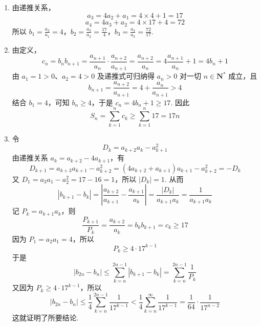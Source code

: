 \begin{solution}
\begin{enumerate}
\item 由递推关系，
\[
a_3=4a_2+a_1=4\times4+1=17
\]
\[
a_4=4a_3+a_2=4\times17+4=72
\]
所以
\(b_1=\frac{a_2}{a_1}=4\)，\(b_2=\frac{a_3}{a_2}=\frac{17}{4}\)，\(b_3=\frac{a_4}{a_3}=\frac{72}{17}\).

\item 由定义，
\[
c_n=b_nb_{n+1}=\frac{a_{n+1}}{a_n}\cdot\frac{a_{n+2}}{a_{n+1}}=\frac{a_{n+2}}{a_n}=4\frac{a_{n+1}}{a_n}+1=4b_n+1
\]
由 \(a_1=1>0\)、\(a_2=4>0\) 及递推式可归纳得 \(a_n>0\) 对一切 \(n\in\mathbf N^*\) 成立，且
\[
b_{n+1}=\frac{a_{n+2}}{a_{n+1}}=4+\frac{a_n}{a_{n+1}}>4
\]
结合 \(b_1=4\)，可知 \(b_n\geqslant4\)，于是 \(c_n=4b_n+1\geqslant17\). 因此
\[
S_n=\sum_{k=1}^{n}c_k\geqslant\sum_{k=1}^{n}17=17n
\]

\item 令
\[
D_k=a_{k+2}a_k-a_{k+1}^2
\]
由递推关系 \(a_k=a_{k+2}-4a_{k+1}\)，有
\[
D_{k+1}=a_{k+3}a_{k+1}-a_{k+2}^2
=(4a_{k+2}+a_{k+1})a_{k+1}-a_{k+2}^2
=-D_k
\]
又 \(D_1=a_3a_1-a_2^2=17-16=1\)，所以 \(|D_k|=1\). 从而
\[
|b_{k+1}-b_k|=\left|\frac{a_{k+2}}{a_{k+1}}-\frac{a_{k+1}}{a_k}\right|
=\frac{|D_k|}{a_{k+1}a_k}=\frac1{a_{k+1}a_k}
\]
记 \(P_k=a_{k+1}a_k\)，则
\[
\frac{P_{k+1}}{P_k}=\frac{a_{k+2}}{a_k}=b_kb_{k+1}=c_k\geqslant17
\]
因为 \(P_1=a_2a_1=4\)，所以
\[
P_k\geqslant4\cdot17^{k-1}
\]
于是
\[
|b_{2n}-b_n|\leqslant\sum_{k=n}^{2n-1}|b_{k+1}-b_k|=\sum_{k=n}^{2n-1}\frac1{P_k}
\]
又因为 \(P_k\geqslant4\cdot17^{k-1}\)，所以
\[
|b_{2n}-b_n|\leqslant\frac14\sum_{k=n}^{2n-1}\frac1{17^{k-1}}<\frac14\sum_{k=n}^{\infty}\frac1{17^{k-1}}=\frac1{64}\cdot\frac1{17^{n-2}}
\]
这就证明了所要结论.
\end{enumerate}
\end{solution}
